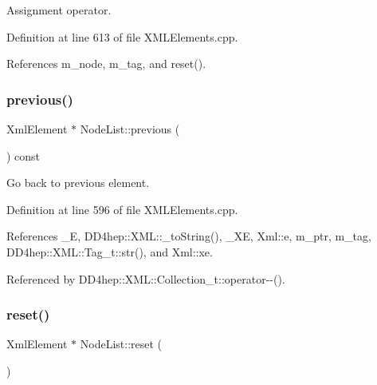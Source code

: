 Assignment operator. 



Definition at line 613 of file X\+M\+L\+Elements.\+cpp.



References m\+\_\+node, m\+\_\+tag, and reset().

\hypertarget{class_d_d4hep_1_1_x_m_l_1_1_node_list_a6ed14334c2084812aa9b8f4b1c8612bd}{}\label{class_d_d4hep_1_1_x_m_l_1_1_node_list_a6ed14334c2084812aa9b8f4b1c8612bd} 
\subsubsection{\texorpdfstring{previous()}{previous()}}
{\footnotesize\ttfamily Xml\+Element $\ast$ Node\+List\+::previous (\begin{DoxyParamCaption}{ }\end{DoxyParamCaption}) const}



Go back to previous element. 



Definition at line 596 of file X\+M\+L\+Elements.\+cpp.



References \+\_\+E, D\+D4hep\+::\+X\+M\+L\+::\+\_\+to\+String(), \+\_\+\+XE, Xml\+::e, m\+\_\+ptr, m\+\_\+tag, D\+D4hep\+::\+X\+M\+L\+::\+Tag\+\_\+t\+::str(), and Xml\+::xe.



Referenced by D\+D4hep\+::\+X\+M\+L\+::\+Collection\+\_\+t\+::operator-\/-\/().

\hypertarget{class_d_d4hep_1_1_x_m_l_1_1_node_list_ac1d472d2a7418c4dadf545044143901d}{}\label{class_d_d4hep_1_1_x_m_l_1_1_node_list_ac1d472d2a7418c4dadf545044143901d} 
\subsubsection{\texorpdfstring{reset()}{reset()}}
{\footnotesize\ttfamily Xml\+Element $\ast$ Node\+List\+::reset (\begin{DoxyParamCaption}{ }\end{DoxyParamCaption})}




